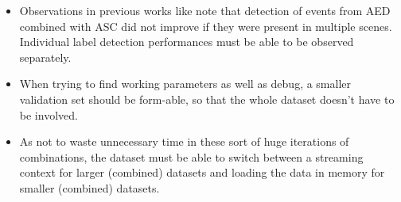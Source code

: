 \begin{itemize}
	\item Observations in previous works like \citet{tonami2019joint} note that detection of events from AED combined with ASC did not improve if they were present in multiple scenes. Individual label detection performances must be able to be observed separately. 
	\item When trying to find working parameters as well as debug, a smaller validation set should be form-able, so that the whole dataset doesn't have to be involved.
	\item As not to waste unnecessary time in these sort of huge iterations of combinations, the dataset must be able to switch between a streaming context for larger (combined) datasets and loading the data in memory for smaller (combined) datasets.
\end{itemize}


